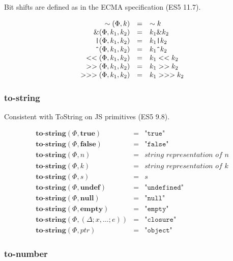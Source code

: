 \documentclass[draft, 10pt]{article}
\newcommand{\expr}[0]{e}
\newcommand{\var}[0]{x}
\newcommand{\num}[0]{n}
\newcommand{\intg}[0]{k}
\newcommand{\str}[0]{s}
\newcommand{\undef}[0]{\textbf{undef}}
\newcommand{\nul}[0]{\textbf{null}}
\newcommand{\empt}[0]{\textbf{empty}}
\newcommand{\true}[0]{\textbf{true}}
\newcommand{\false}[0]{\textbf{false}}
\newcommand{\optostr}[0]{\textbf{to-string}}
\newcommand{\opbnot}[0]{\sim}
\newcommand{\opband}[0]{\&}
\newcommand{\opbor}[0]{\texttt{|}}
\newcommand{\opbxor}[0]{\texttt{\^{}}}
\newcommand{\opshiftl}[0]{<<}
\newcommand{\opshiftr}[0]{>>}
\newcommand{\opzfshiftr}[0]{>>>}
\newcommand{\varenv}[0]{\Delta}
\newcommand{\heap}[0]{\Phi}
\newcommand{\closure}[3]{(#1; #2; #3)}
\newcommand{\heapptr}{ptr}
\newcommand{\rununop}[3]{#1(#2,#3)}
\newcommand{\runbinop}[4]{#1(#2,#3,#4)}
\begin{document}
Bit shifts are defined as in the ECMA specification (ES5 11.7).

\[
\begin{array}{rcl}
\rununop{\opbnot}{\heap}{\intg} &=& \opbnot\intg \\
\runbinop{\opband}{\heap}{\intg_1}{\intg_2} &=& \intg_1 \opband \intg_2 \\
\runbinop{\opbor}{\heap}{\intg_1}{\intg_2} &=& \intg_1 \opbor \intg_2 \\
\runbinop{\opbxor}{\heap}{\intg_1}{\intg_2} &=& \intg_1 \opbxor \intg_2 \\
\runbinop{\opshiftl}{\heap}{\intg_1}{\intg_2} &=& \intg_1 \opshiftl \intg_2 \\
\runbinop{\opshiftr}{\heap}{\intg_1}{\intg_2} &=& \intg_1 \opshiftr \intg_2 \\
\runbinop{\opzfshiftr}{\heap}{\intg_1}{\intg_2} &=& \intg_1 \opzfshiftr \intg_2 
\end{array}
\]

\subsubsection{to-string}

Consistent with ToString on JS primitives (ES5 9.8).

\[
\begin{array}{rcl}
\rununop{\optostr}{\heap}{\true} &=& \texttt{"true"} \\
\rununop{\optostr}{\heap}{\false} &=& \texttt{"false"} \\
\rununop{\optostr}{\heap}{\num} &=& \textit{string representation of $\num$} \\
\rununop{\optostr}{\heap}{\intg} &=& \textit{string representation of $\intg$} \\
\rununop{\optostr}{\heap}{\str} &=& \str \\
\rununop{\optostr}{\heap}{\undef} &=& \texttt{"undefined"} \\
\rununop{\optostr}{\heap}{\nul} &=& \texttt{"null"} \\
\rununop{\optostr}{\heap}{\empt} &=& \texttt{"empty"} \\
\rununop{\optostr}{\heap}{\closure{\varenv}{\var, \dots}{\expr}} &=& \texttt{"closure"} \\
\rununop{\optostr}{\heap}{\heapptr} &=& \texttt{"object"} 
\end{array}
\]

\subsubsection{to-number}
\end{document}
